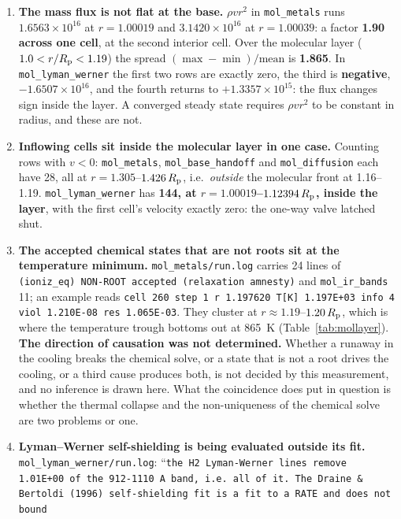 \documentclass[english,a4paper]{my_memo}
\newcommand{\Rp}{R_{\rm p}}
\begin{document}
\begin{enumerate}[nosep,leftmargin=*]
  \item \textbf{The mass flux is not flat at the base.} $\rho v r^2$ in
    \texttt{mol\_metals} runs $1.6563\times10^{16}$ at $r = 1.00019$ and
    $3.1420\times10^{16}$ at $r = 1.00039$: a factor \textbf{1.90 across
    one cell}, at the second interior cell. Over the molecular layer
    ($1.0 < r/\Rp < 1.19$) the spread $(\max-\min)/\mathrm{mean}$ is
    \textbf{1.865}. In \texttt{mol\_lyman\_werner} the first two rows are
    exactly zero, the third is \textbf{negative}, $-1.6507\times10^{16}$, and
    the fourth returns to $+1.3357\times10^{15}$: the flux changes sign inside
    the layer. A converged steady state requires $\rho v r^2$ to be constant
    in radius, and these are not.
  \item \textbf{Inflowing cells sit inside the molecular layer in one case.}
    Counting rows with $v < 0$: \texttt{mol\_metals},
    \texttt{mol\_base\_handoff} and \texttt{mol\_diffusion} each have 28, all
    at $r = 1.305$--$1.426\,\Rp$, i.e.\ \emph{outside} the molecular front at
    1.16--1.19. \texttt{mol\_lyman\_werner} has \textbf{144, at
    $r = 1.00019$--$1.12394\,\Rp$, inside the layer}, with the first cell's
    velocity exactly zero: the one-way valve latched shut.
  \item \textbf{The accepted chemical states that are not roots sit at the
    temperature minimum.} \texttt{mol\_metals/run.log} carries 24 lines of
    \texttt{(ioniz\_eq) NON-ROOT accepted (relaxation amnesty)} and
    \texttt{mol\_ir\_bands} 11; an example reads \texttt{cell 260 step 1 r
    1.197620 T[K] 1.197E+03 info 4 viol 1.210E-08 res 1.065E-03}. They cluster
    at $r \approx 1.19$--$1.20\,\Rp$, which is where the temperature trough
    bottoms out at 865~K (Table~\ref{tab:mollayer}).
    \textbf{The direction of causation was not determined.} Whether a runaway
    in the cooling breaks the chemical solve, or a state that is not a root
    drives the cooling, or a third cause produces both, is not decided by this
    measurement, and no inference is drawn here. What the coincidence does put
    in question is whether the thermal collapse and the non-uniqueness of the
    chemical solve are two problems or one.
  \item \textbf{Lyman--Werner self-shielding is being evaluated outside its
    fit.} \texttt{mol\_lyman\_werner/run.log}: ``\texttt{the H2 Lyman-Werner
    lines remove 1.01E+00 of the 912-1110 A band, i.e.\ all of it. The Draine
    \& Bertoldi (1996) self-shielding fit is a fit to a RATE and does not bound
}
\end{enumerate}
\end{document}
